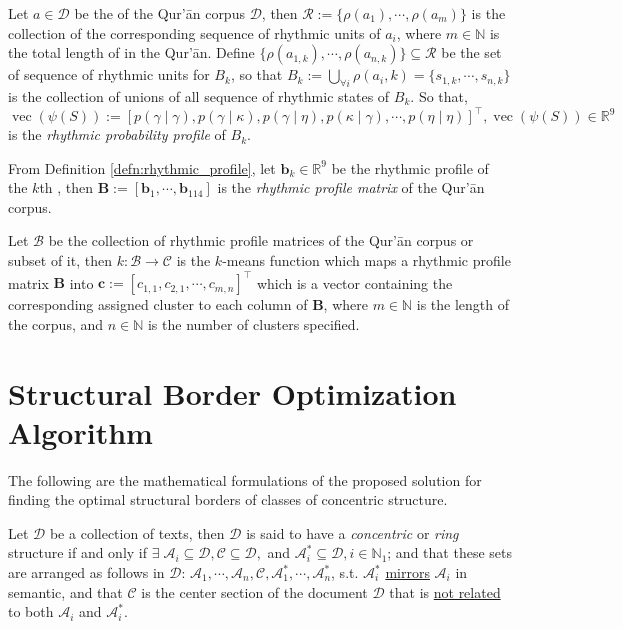 \begin{defn}\label{defn:rhythmic_profile}
    Let $a\in\mathscr{D}$ be the   of the Qur'\=an corpus $\mathscr{D}$, then $\mathscr{R}:=\{\rho(a_1),\cdots,\rho(a_m)\}$ is the collection of the corresponding sequence of rhythmic units of $a_i$, where $m\in\mathbb{N}$ is the total length of   in the Qur'\=an. Define $\{\rho(a_{1,k}),\cdots,\rho(a_{n,k})\}\subseteq\mathscr{R}$ be the set of sequence of rhythmic units for   $B_k$, so that $B_k:=\bigcup_{\forall i} \rho(a_i,k)=\{s_{1,k},\cdots,s_{n,k}\}$ is the collection of unions of all sequence of rhythmic states of   $B_k$. So that, $\operatorname{vec}(\psi(S)):=[p(\gamma\mid\gamma),p(\gamma\mid\kappa),p(\gamma\mid\eta),p(\kappa\mid\gamma),\cdots,p(\eta\mid\eta)]^{\top}, \operatorname{vec}(\psi(S))\in\mathbb{R}^{9}$ is the \textit{rhythmic probability profile} of   $B_k$.
\end{defn}
\begin{defn}
    From Definition \ref{defn:rhythmic_profile}, let $\mathbf{b}_k\in\mathbb{R}^9$ be the rhythmic profile of the $k$th  , then $\mathbf{B}:=[\mathbf{b}_1,\cdots,\mathbf{b}_{114}]$ is the \textit{rhythmic profile matrix} of the Qur'\=an corpus.
\end{defn}
\begin{defn}
    Let $\mathscr{B}$ be the collection of rhythmic profile matrices of the Qur'\=an corpus or subset of it, then $k:\mathscr{B}\rightarrow\mathscr{C}$ is the $k$-means function which maps a rhythmic profile matrix $\mathbf{B}$ into $\mathbf{c}:=[c_{1,1},c_{2,1},\cdots,c_{m,n}]^{\top}$ which is a vector containing the corresponding assigned cluster to each column of $\mathbf{B}$, where $m\in\mathbb{N}$ is the length of the corpus, and $n\in\mathbb{N}$ is the number of clusters specified.
\end{defn}
\section{Structural Border Optimization Algorithm}
The following are the mathematical formulations of the proposed solution for finding the optimal structural borders of classes of concentric structure.
\begin{defn}[\it Concentric]\label{defn:concentric}
    Let $\mathscr{D}$ be a collection of texts, then $\mathscr{D}$ is said to have a \textit{concentric} or \textit{ring} structure if and only if $\exists\;\mathscr{A}_i\subseteq\mathscr{D},\mathscr{C}\subseteq\mathscr{D},$ and $\mathscr{A}_i^{*}\subseteq\mathscr{D},i\in\mathbb{N}_1$; and that these sets are arranged as follows in $\mathscr{D}$:  $\mathscr{A}_1,\cdots,\mathscr{A}_n,\mathscr{C},\mathscr{A}_1^{*},\cdots,\mathscr{A}_n^{*}$, s.t. $\mathscr{A}_i^{*}$ \underline{mirrors} $\mathscr{A}_i$ in semantic, and that $\mathscr{C}$ is the center section of the document $\mathscr{D}$ that is \underline{not related} to both $\mathscr{A}_i$ and $\mathscr{A}_i^{*}$.
\end{defn}

